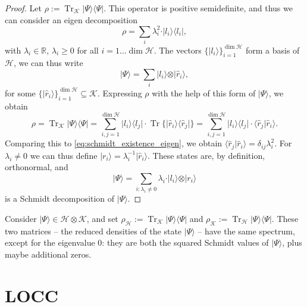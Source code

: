 \documentclass{article}
\theoremstyle{definition}
\newcommand{\tr}{\operatorname{Tr}}
\newcommand{\ket}[1]{\vert #1 \rangle}
\newcommand{\bra}[1]{\langle #1 \vert}
\newcommand{\scalprod}[2]{\langle #1 \vert #2 \rangle}
\begin{document}
\begin{proof}
  Let $\rho := \tr_{\mathcal{K}} \ket{\Psi}\bra{\Psi}$. This operator is positive semidefinite, and thus we can consider an eigen decomposition
  \begin{equation}\label{eq:schmidt_existence_eigen}
    \rho = \sum_i \lambda_i^2 \cdot \ket{l_i}\bra{l_i},
  \end{equation}
  with $\lambda_i\in\mathbb{R}$, $\lambda_i\geq 0$ for all $i=1\dots \dim\mathcal{H}$. The vectors $\{\ket{l_i}\}_{i=1}^{\dim \mathcal{H}}$ form a basis of $\mathcal{H}$, we can thus write 
  \begin{equation*}
    \ket{\Psi}  = \sum_i \ket{l_i} \otimes \ket{\hat{r}_i},
  \end{equation*}
  for some $\{\ket{\hat{r}_i}\}_{i=1}^{\dim \mathcal{H}}\subseteq \mathcal{K}$. Expressing $\rho$ with the help of this form of $\ket{\Psi}$, we obtain 
  \begin{equation*}
    \rho = \tr_{\mathcal{K}} \ket{\Psi}\bra{\Psi} = \sum_{i,j=1}^{\dim \mathcal{H}} \ket{l_i}\bra{l_j} \cdot \tr \{ \ket{\hat{r}_i}\bra{\hat{r}_j}\}= \sum_{i,j=1}^{\dim \mathcal{H}} \ket{l_i}\bra{l_j} \cdot \scalprod{\hat{r}_j}{\hat{r}_i}.
  \end{equation*}
  Comparing this to \cref{eq:schmidt_existence_eigen}, we obtain $\scalprod{\hat{r}_j}{\hat{r}_i} = \delta_{ij} \lambda_i^2$. For $\lambda_i\neq 0$ we can thus define  $\ket{r_i} = \lambda_i^{-1} \ket{\hat{r}_i}$. These states are, by definition, orthonormal, and 
  \begin{equation*}
    \ket{\Psi} = \sum_{i: \lambda_i\neq 0} \lambda_i \cdot \ket{l_i} \otimes \ket{r_i}
  \end{equation*}
  is a Schmidt decomposition of $\ket{\Psi}$.
\end{proof}

Consider $\ket{\Psi}\in\mathcal{H}\otimes \mathcal{K}$, and set $\rho_{\mathcal{H}} := \tr_{\mathcal{K}} \ket{\Psi}\bra{\Psi}$ and $\rho_{\mathcal{K}} := \tr_{\mathcal{H}} \ket{\Psi}\bra{\Psi}$. These two matrices -- the reduced densities of the state $\ket{\Psi}$ -- have the same spectrum, except for the eigenvalue $0$: they are both the squared Schmidt values of $\ket{\Psi}$, plus maybe additional zeros.  

\section{LOCC}
\end{document}
